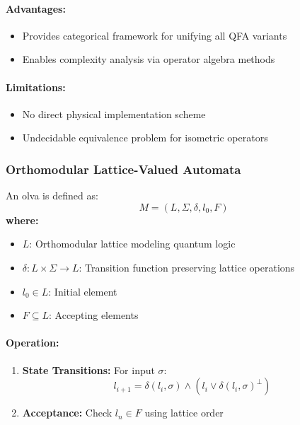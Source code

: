 \paragraph{Advantages:}
\begin{itemize}
    \item Provides categorical framework for unifying all QFA variants
    \item Enables complexity analysis via operator algebra methods
\end{itemize}

\paragraph{Limitations:}
\begin{itemize}
    \item No direct physical implementation scheme
    \item Undecidable equivalence problem for isometric operators
\end{itemize}

\subsubsection{Orthomodular Lattice-Valued Automata}
\label{subsec:olva}

\begin{definition}
An \gls{olva} is defined as:
\[
M = (L, \Sigma, \delta, l_0, F)
\]
\textbf{where:}
\begin{itemize}
    \item $L$: Orthomodular lattice modeling quantum logic
    \item $\delta: L \times \Sigma \rightarrow L$: Transition function preserving lattice operations
    \item $l_0 \in L$: Initial element
    \item $F \subseteq L$: Accepting elements
\end{itemize}
\end{definition}

\paragraph{Operation:}
\begin{enumerate}
    \item \textbf{State Transitions:} For input $\sigma$:
\[
l_{i+1} = \delta(l_i, \sigma) \land (l_i \lor \delta(l_i, \sigma)^\perp)
\]
    \item \textbf{Acceptance:} Check $l_n \in F$ using lattice order
\end{enumerate}

